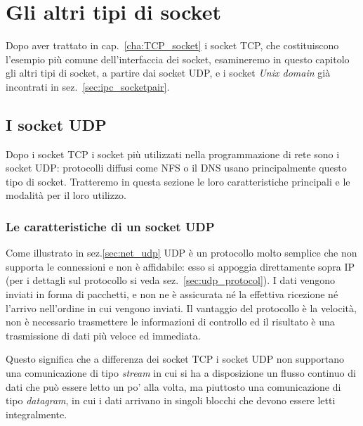 
\chapter{Gli altri tipi di socket}
\label{cha:other_socket}

Dopo aver trattato in cap.~\ref{cha:TCP_socket} i socket TCP, che
costituiscono l'esempio più comune dell'interfaccia dei socket, esamineremo in
questo capitolo gli altri tipi di socket, a partire dai socket UDP, e i socket
\textit{Unix domain} già incontrati in sez.~\ref{sec:ipc_socketpair}.


\section{I socket UDP}
\label{sec:UDP_socket}

Dopo i socket TCP i socket più utilizzati nella programmazione di rete sono i
socket UDP: protocolli diffusi come NFS o il DNS usano principalmente questo
tipo di socket. Tratteremo in questa sezione le loro caratteristiche
principali e le modalità per il loro utilizzo.


\subsection{Le caratteristiche di un socket UDP}
\label{sec:UDP_characteristics}

Come illustrato in sez.\ref{sec:net_udp} UDP è un protocollo molto semplice che
non supporta le connessioni e non è affidabile: esso si appoggia direttamente
sopra IP (per i dettagli sul protocollo si veda sez.~\ref{sec:udp_protocol}).
I dati vengono inviati in forma di pacchetti, e non ne è assicurata né la
effettiva ricezione né l'arrivo nell'ordine in cui vengono inviati. Il
vantaggio del protocollo è la velocità, non è necessario trasmettere le
informazioni di controllo ed il risultato è una trasmissione di dati più
veloce ed immediata.

Questo significa che a differenza dei socket TCP i socket UDP non supportano
una comunicazione di tipo \textit{stream} in cui si ha a disposizione un
flusso continuo di dati che può essere letto un po' alla volta, ma piuttosto
una comunicazione di tipo \textit{datagram}, in cui i dati arrivano in singoli
blocchi che devono essere letti integralmente.

